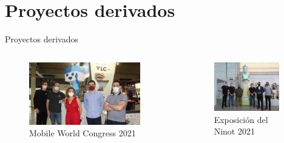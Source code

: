 \section{Proyectos derivados}
\begin{frame}{Proyectos derivados}

\begin{columns}

  \begin{column}{0.5\textwidth}
    \begin{figure}[ht]
    \centering
    \includegraphics[width=0.9\textwidth]{Images/proyectos-derivados/mwc2021-aivision.jpg}
    \caption{\label{fig:mwc2021-aivision}Mobile World Congress 2021}
    \end{figure}
  \end{column}
  
  \begin{column}{0.5\textwidth}  %
    \begin{figure}[ht]
    \centering
    \includegraphics[width=0.9\textwidth]{Images/proyectos-derivados/exponinot2021-aivision.jpg}
    \caption{\label{exponinot2021-aivision}Exposición del Ninot 2021}
    \end{figure}    
  \end{column}
  

\end{columns}
\end{frame}
